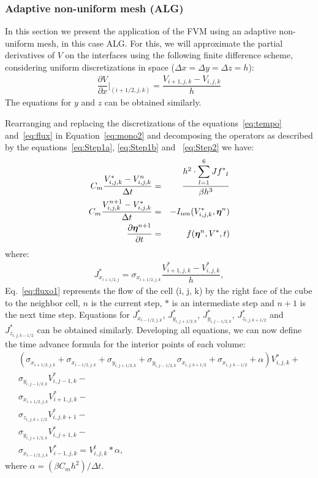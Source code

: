 \subsubsection{Adaptive non-uniform mesh (ALG)}

In this section we present the application of the FVM using an adaptive non-
uniform mesh, in this case ALG. For this, we will approximate the partial derivatives of $V$ on
the interfaces using the following finite difference scheme, considering uniform
discretizations in space ($\Delta x = \Delta y = \Delta z = h$):
\begin{eqnarray}
    \label{eq:dvdx1}
    \dfrac{\partial V}{\partial x} \bigg|_{(i+1/2,j,k)} = \dfrac{V_{i+1,j,k} - V_{i,j,k}}{h}
\end{eqnarray}
The equations for $y$ and $z$ can be obtained similarly.

Rearranging and replacing the discretizations of the equations~\eqref{eq:tempo}
and~\eqref{eq:flux} in Equation~\eqref{eq:mono2} and decomposing the
operators as described by the equations~\eqref{eq:Step1a}, \eqref{eq:Step1b} and~
\eqref{eq:Step2} we have:
\begin{eqnarray}
C_m \dfrac{V^{*}_{i,j,k} - V^{n}_{i,j,k}}{\Delta t} &=&\dfrac{h^2 \cdot \displaystyle
          \sum_{l=1}^{6}{{Jf^*}_l} }{\beta h^3} \\
C_m \dfrac{V^{n+1}_{i,j,k} - V^{*}_{i,j,k}}{\Delta t} &=& -I_{ion}(V^*_{i,j,k},\boldsymbol{\eta}^n) \\
\dfrac{\partial \boldsymbol{\eta}^{n+1}}{\partial t} &=& f(\boldsymbol{\eta}^n, V^*, t)
\end{eqnarray}
where:
\begin{eqnarray}
   J^*_{x_{i+1/2,j}} =
   \sigma_{x_{i+1/2,j,k}} \dfrac{V^{*}_{i+1,j,k} - V^{*}_{i,j,k}}{h},
   \label{eq:fluxo1}
\end{eqnarray}
Eq.~\eqref{eq:fluxo1} represents the flow of the cell (i, j, k) by the right
face of the cube to the neighbor cell, $n$ is the current step, $*$ is
an intermediate step and $n+1$ is the next time step. Equations for
$J^*_{x_{i-1/2,j,k}}$, $J^*_{y_{i,j+1/2,k}}$, $J^*_{y_{i,j-1/2,k}}$,
$J^*_{z_{i,j, k+1/2}}$ and $J^*_{z_{i,j, k-1/2}}$ can be obtained similarly.
Developing all equations, we can now define the time advance formula for
the interior points of each volume:
\begin{align}
\label{eq:sis_so}
\nonumber
(\sigma_{x_{i+1/2,j,k}}+\sigma_{x_{i-1/2,j,k}} +\sigma_{y_{i,j+1/2,k}} + \sigma_{y_{i,j-1/2,k}} \sigma_{x_{i,j,k+1/2}}+\sigma_{x_{i,j,k-1/2}} + \alpha) V^*_{i,j,k} + \\ \nonumber
\sigma_{y_{i,j-1/2,k}} V^*_{i,j-1,k} -\\ \nonumber
\sigma_{x_{i+1/2,j,k}} V^*_{i+1,j,k} -\\ \nonumber
\sigma_{z_{i,j,k+1/2}} V^*_{i,j,k+1} -\\ \nonumber
\sigma_{y_{i,j+1/2,k}} V^*_{i,j+1,k} -\\ \nonumber
\sigma_{x_{i-1/2,j,k}} V^*_{i-1,j,k}  =
V^t_{i,j,k}*\alpha,
\end{align}
where $\alpha = (\beta C_m h^2)/\Delta t$.

